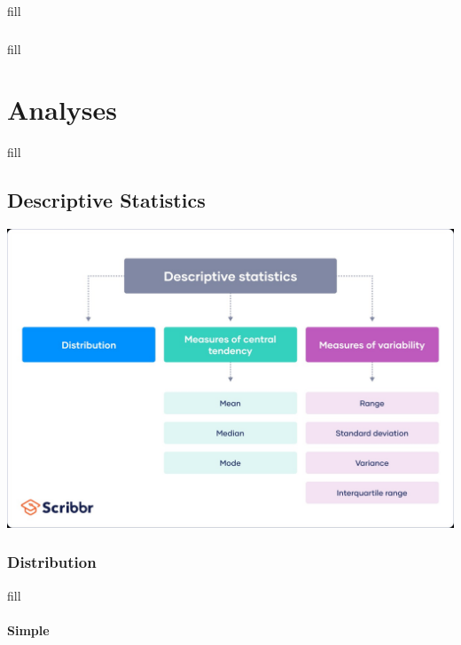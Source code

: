 \documentclass[
  b5paper]{book}
\begin{document}
fill

\hypertarget{section-3}{%
\subsection*{}\label{section-3}}

fill

\hypertarget{analyses-1}{%
\chapter{Analyses}\label{analyses-1}}

fill

\hypertarget{descriptive-statistics}{%
\section{Descriptive Statistics}\label{descriptive-statistics}}

\href{Descriptive\%20Stats\%20Graphic}{\includegraphics[width=1\textwidth,height=\textheight]{images/desc_stats.jpg}}

\hypertarget{distribution-1}{%
\subsection*{Distribution}\label{distribution-1}}

fill

\hypertarget{simple}{%
\subsubsection*{Simple}\label{simple}}
\end{document}
